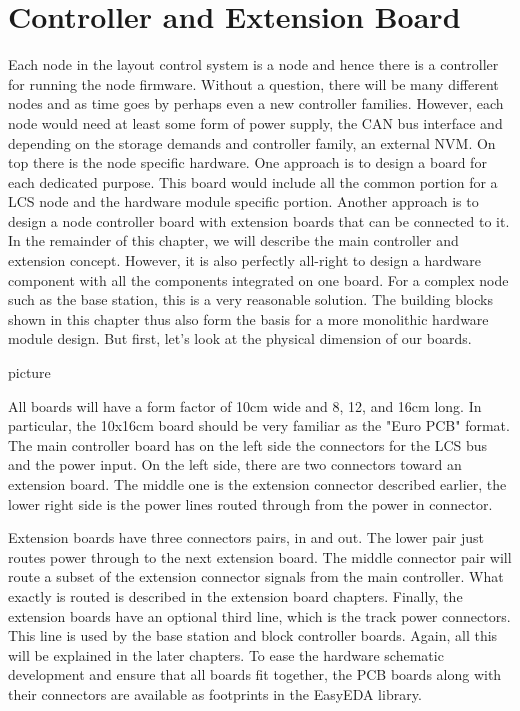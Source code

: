 \section{Controller and Extension Board}

Each node in the layout control system is a node and hence there is a controller for running the node firmware. Without a question, there will be many different nodes and as time goes by perhaps even a new controller families. However, each node would need at least some form of power supply, the CAN bus interface and depending on the storage demands and controller family, an external NVM. On top there is the node specific hardware. One approach is to design a board for each dedicated purpose. This board would include all the common portion for a LCS node and the hardware module specific portion. Another approach is to design a node controller board with extension boards that can be connected to it. In the remainder of this chapter, we will describe the main controller and extension concept. However, it is also perfectly all-right to design a hardware component with all the components integrated on one board. For a complex node such as the base station, this is a very reasonable solution. The building blocks shown in this chapter thus also form the basis for a more monolithic hardware module design. But first, let's look at the physical dimension of our boards.

picture 

All boards will have a form factor of 10cm wide and 8, 12, and 16cm long. In particular, the 10x16cm board should be very familiar as the "Euro PCB" format. The main controller board has on the left side the connectors for the LCS bus and the power input. On the left side, there are two connectors toward an extension board. The middle one is the extension connector described earlier, the lower right side is the power lines routed through from the power in connector.

Extension boards have three connectors pairs, in and out. The lower pair just routes power through to the next extension board. The middle connector pair will route a subset of the extension connector signals from the main controller. What exactly is routed is described in the extension board chapters. Finally, the extension boards have an optional third line, which is the track power connectors. This line is used by the base station and block controller boards. Again, all this will be explained in the later chapters. To ease the hardware schematic development and ensure that all boards fit together, the PCB boards along with their connectors are available as footprints in the EasyEDA library.

